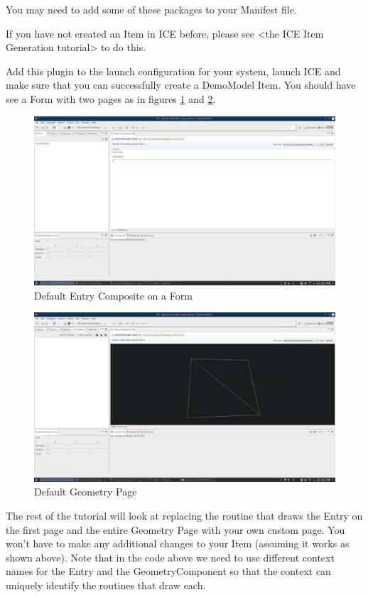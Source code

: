 You may need to add some of these packages to your Manifest file.

If you have not created an Item in ICE before, please see <the ICE Item
Generation tutorial> to do this.

Add this plugin to the launch configuration for your system, launch ICE and
make sure that you can successfully create a DemoModel Item. You should have
see a Form with two pages as in figures \ref{fig:iceDefaultEntryPage} and
\ref{fig:iceDefaultGeometryPage}.

\begin{figure}[h]
\includegraphics[width=\textwidth]{pics/dynamicUI_defaultEntryPage.png}
\caption{Default Entry Composite on a Form}
\label{fig:iceDefaultEntryPage}
\end{figure}

\begin{figure}[h]
\includegraphics[width=\textwidth]{pics/dynamicUI_defaultGeometryPage.png}
\caption{Default Geometry Page}
\label{fig:iceDefaultGeometryPage}
\end{figure}

The rest of the tutorial will look at replacing the routine that draws the
Entry on the first page and the entire Geometry Page with your own custom page.
You won’t have to make any additional changes to your Item (assuming it works
as shown above). Note that in the code above we need to use different context
names for the Entry and the GeometryComponent so that the context can uniquely
identify the routines that draw each.

